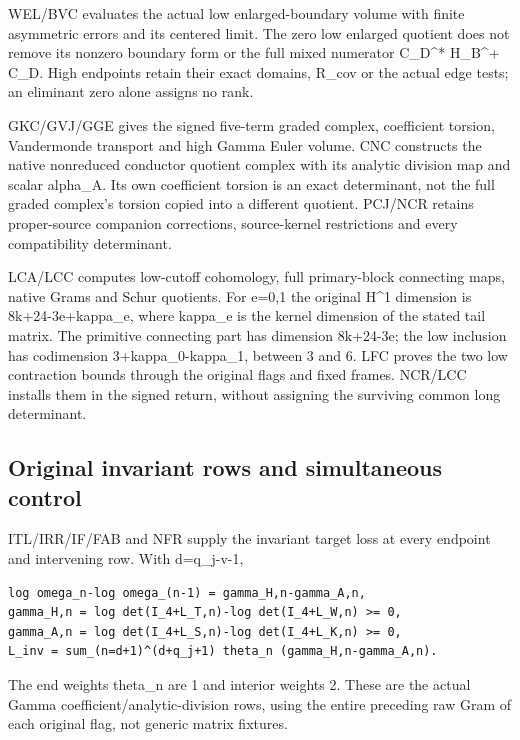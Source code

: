 \documentclass[
]{article}
\begin{document}
WEL/BVC evaluates the actual low enlarged-boundary volume with finite
asymmetric errors and its centered limit. The zero low enlarged quotient
does not remove its nonzero boundary form or the full mixed numerator
C\_D\^{}* H\_B\^{}+ C\_D. High endpoints retain their exact domains,
R\_cov or the actual edge tests; an eliminant zero alone assigns no
rank.

GKC/GVJ/GGE gives the signed five-term graded complex, coefficient
torsion, Vandermonde transport and high Gamma Euler volume. CNC
constructs the native nonreduced conductor quotient complex with its
analytic division map and scalar alpha\_A. Its own coefficient torsion
is an exact determinant, not the full graded complex's torsion copied
into a different quotient. PCJ/NCR retains proper-source companion
corrections, source-kernel restrictions and every compatibility
determinant.

LCA/LCC computes low-cutoff cohomology, full primary-block connecting
maps, native Grams and Schur quotients. For e=0,1 the original H\^{}1
dimension is 8k+24-3e+kappa\_e, where kappa\_e is the kernel dimension
of the stated tail matrix. The primitive connecting part has dimension
8k+24-3e; the low inclusion has codimension 3+kappa\_0-kappa\_1, between
3 and 6. LFC proves the two low contraction bounds through the original
flags and fixed frames. NCR/LCC installs them in the signed return,
without assigning the surviving common long determinant.

\subsection{Original invariant rows and simultaneous
control}\label{original-invariant-rows-and-simultaneous-control}

ITL/IRR/IF/FAB and NFR supply the invariant target loss at every
endpoint and intervening row. With d=q\_j-v-1,

\begin{verbatim}
log omega_n-log omega_(n-1) = gamma_H,n-gamma_A,n,
gamma_H,n = log det(I_4+L_T,n)-log det(I_4+L_W,n) >= 0,
gamma_A,n = log det(I_4+L_S,n)-log det(I_4+L_K,n) >= 0,
L_inv = sum_(n=d+1)^(d+q_j+1) theta_n (gamma_H,n-gamma_A,n).
\end{verbatim}

The end weights theta\_n are 1 and interior weights 2. These are the
actual Gamma coefficient/analytic-division rows, using the entire
preceding raw Gram of each original flag, not generic matrix fixtures.
\end{document}
